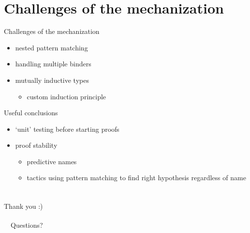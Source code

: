 \documentclass{beamer}
\begin{document}
\section{Challenges of the mechanization}
\begin{frame}{Challenges of the mechanization}
\begin{itemize}
  \item nested pattern matching
  \item handling multiple binders
  \item mutually inductive types
  \begin{itemize}
    \item custom induction principle
  \end{itemize}
\end{itemize}
\end{frame}

\begin{frame}{Useful conclusions}
\begin{itemize}
  \item `unit' testing before starting proofs
  \item proof stability
  \begin{itemize}
    \item predictive names
    \item tactics using pattern matching to find right hypothesis regardless of name
  \end{itemize}
\end{itemize}
\end{frame}

\section{}
\begin{frame}

 {\Huge{Thank you :)}}
 \\~\  \\~\
 Questions?
\end{frame}
\end{document}
